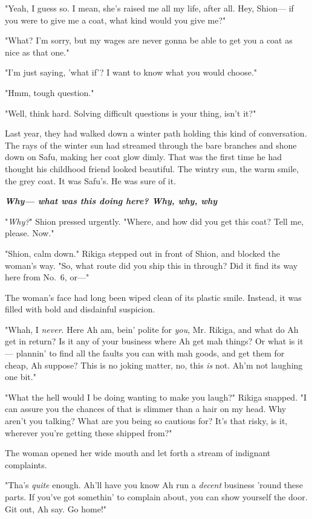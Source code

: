 "Yeah, I guess so. I mean, she's raised me all my life, after all. Hey,
Shion--- if you were to give me a coat, what kind would you give me?"

"What? I'm sorry, but my wages are never gonna be able to get you a coat
as nice as that one."

"I'm just saying, 'what if'? I want to know what you would choose."

"Hmm, tough question."

"Well, think hard. Solving difficult questions is your thing, isn't it?"

Last year, they had walked down a winter path holding this kind of
conversation. The rays of the winter sun had streamed through the bare
branches and shone down on Safu, making her coat glow dimly. That was
the first time he had thought his childhood friend looked beautiful. The
wintry sun, the warm smile, the grey coat. It was Safu's. He was sure of
it.

\textbf{\emph{Why--- what was this doing here? Why, why, why\el }}

"\emph{Why?}" Shion pressed urgently. "Where, and how did you get this coat?
Tell me, please. Now."

"Shion, calm down." Rikiga stepped out in front of Shion, and blocked
the woman's way. "So, what route did you ship this in through? Did it
find its way here from No.~6, or---"

The woman's face had long been wiped clean of its plastic smile.
Instead, it was filled with bold and disdainful suspicion.

"Whah, I \emph{never}. Here Ah am, bein' polite for \emph{you}, Mr. Rikiga, and what
do Ah get in return? Is it any of your business where Ah get mah things?
Or what is it--- plannin' to find all the faults you can with mah goods,
and get them for cheap, Ah suppose? This is no joking matter, no, this
\emph{is} not. Ah'm not laughing one bit."

"What the hell would I be doing wanting to make you laugh?" Rikiga
snapped. "I can assure you the chances of that is slimmer than a hair on
my head. Why aren't you talking? What are you being so cautious for?
It's that risky, is it, wherever you're getting these shipped from?"

The woman opened her wide mouth and let forth a stream of indignant
complaints.

"Tha's \emph{quite} enough. Ah'll have you know Ah run a \emph{decent} business 'round
these parts. If you've got somethin' to complain about, you can show
yourself the door. Git out, Ah say. Go home!"

